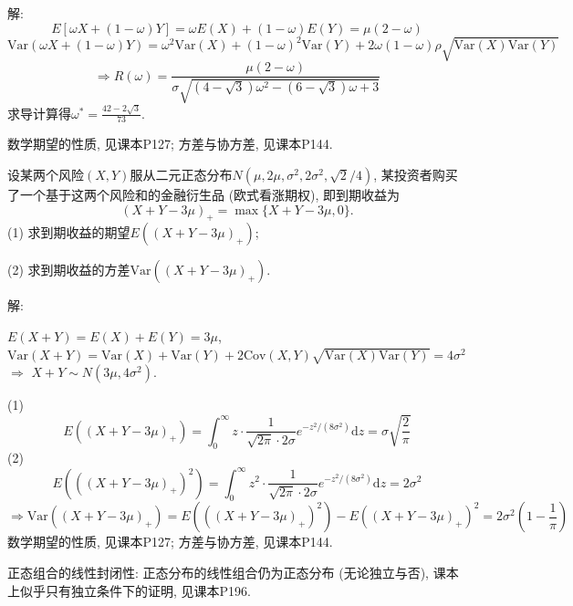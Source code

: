 \documentclass[standard]{ExBook}
\begin{document}
\begin{qitems}
\vspace{-5em}

    \begin{bbox}
解: 
$$E[\omega X+(1-\omega)Y]=\omega E(X)+(1-\omega)E(Y)=\mu(2-\omega)$$
$$\mathrm{Var}(\omega X+(1-\omega)Y)=\omega^2 \mathrm{Var}(X)+(1-\omega)^2 \mathrm{Var}(Y)+2\omega(1-\omega)\rho\sqrt{\mathrm{Var}(X)\mathrm{Var}(Y)}$$
$$\Longrightarrow R(\omega)=\displaystyle\frac{\mu(2-\omega)}{\sigma\sqrt{(4-\sqrt{3})\omega^2-(6-\sqrt{3})\omega+3}}$$
求导计算得$\omega^{*}=\displaystyle\frac{42-2\sqrt{3}}{73}$.

\textcolor{themeColor}{\selectfont {} 数学期望的性质, 见课本P127; 方差与协方差, 见课本P144.}
    \end{bbox}

\vspace{-5em}

    \begin{bbox}
    \begin{shaded}
        \qitem
设某两个风险$ ( X , Y ) $服从二元正态分布$N(\mu,2\mu,\sigma^2,2\sigma^2,\sqrt{2}/4)$, 某投资者购买了一个基于这两个风险和的金融衍生品 (欧式看涨期权), 即到期收益为
$$(X+Y-3\mu)_{+}=\max\{X+Y-3\mu,0\}.$$
(1) 求到期收益的期望$E((X+Y-3\mu)_+)$;

(2) 求到期收益的方差$\mathrm{Var}((X+Y-3\mu)_+)$.
    \end{shaded}
    \end{bbox}

\vspace{-5em}

    \begin{bbox}
解: 

$E(X+Y)=E(X)+E(Y)=3\mu$, $\mathrm{Var}(X+Y)=\mathrm{Var}(X)+\mathrm{Var}(Y)+2\mathrm{Cov}(X,Y)\sqrt{\mathrm{Var}(X)\mathrm{Var}(Y)}=4\sigma^2$ $\Longrightarrow$ $X+Y\sim N(3\mu,4\sigma^2)$.

(1)
$$E((X+Y-3\mu)_+)=\displaystyle\int_{0}^{\infty}z\cdot \frac{1}{\sqrt{2\pi}\cdot2\sigma}e^{-z^2/(8\sigma^2)}\mathrm{d}z=\sigma\sqrt{\frac{2}{\pi}}$$
(2)
$$E(((X+Y-3\mu)_+)^2)=\displaystyle\int_{0}^{\infty}z^2\cdot \frac{1}{\sqrt{2\pi}\cdot2\sigma}e^{-z^2/(8\sigma^2)}\mathrm{d}z=2\sigma^2$$
$$\Longrightarrow \mathrm{Var}((X+Y-3\mu)_+)=E(((X+Y-3\mu)_+)^2)-E((X+Y-3\mu)_+)^2=2\sigma^2\left(1-\frac{1}{\pi}\right)$$
\textcolor{themeColor}{\selectfont {} 数学期望的性质, 见课本P127; 方差与协方差, 见课本P144.}

\textcolor{themeColor}{\selectfont {} 正态组合的线性封闭性: 正态分布的线性组合仍为正态分布 (无论独立与否), 课本上似乎只有独立条件下的证明, 见课本P196.}


\end{bbox}
\end{qitems}
\end{document}
